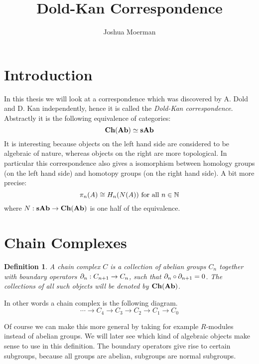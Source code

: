 \documentclass[12pt]{amsproc}
\title{Dold-Kan Correspondence}
\author{Joshua Moerman}
\newtheorem{definition}[theorem]{Definition}
\begin{document}
\maketitle

\section{Introduction}
In this thesis we will look at a correspondence which was discovered by A. Dold and D. Kan independently, hence it is called the \emph{Dold-Kan correspondence}. Abstractly it is the following equivalence of categories:
$$ \mathbf{Ch}(\mathbf{Ab}) \simeq \mathbf{sAb} $$
It is interesting because objects on the left hand side are considered to be algebraic of nature, whereas objects on the right are more topological. In particular this correspondence also gives a isomorphism between homology groups (on the left hand side) and homotopy groups (on the right hand side). A bit more precise:
$$ \pi_n(A) \cong H_n(N(A)) \text{ for all } n \in \mathbb{N} $$
where $N: \mathbf{sAb} \to \mathbf{Ch}(\mathbf{Ab})$ is one half of the equivalence.

\section{Chain Complexes}
\begin{definition}
	A chain complex $C$ is a collection of abelian groups $C_n$ together with boundary operators $\partial_n: C_{n+1} \to C_n$, such that $\partial_n \circ \partial_{n+1} = 0$. The collections of all such objects will be denoted by $\mathbf{Ch}(\mathbf{Ab})$.
\end{definition}

In other words a chain complex is the following diagram.
$$ \cdots \to C_4 \to C_3 \to C_2 \to C_1 \to C_0 $$

Of course we can make this more general by taking for example $R$-modules instead of abelian groups. We will later see which kind of algebraic objects make sense to use in this definition. The boundary operators give rise to certain subgroups, because all groups are abelian, subgroups are normal subgroups.
\end{document}
